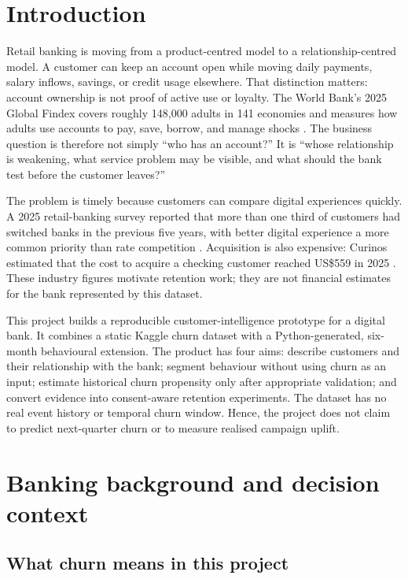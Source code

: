 \section{Introduction}

Retail banking is moving from a product-centred model to a relationship-centred model. A customer can keep an account open while moving daily payments, salary inflows, savings, or credit usage elsewhere. That distinction matters: account ownership is not proof of active use or loyalty. The World Bank's 2025 Global Findex covers roughly 148,000 adults in 141 economies and measures how adults use accounts to pay, save, borrow, and manage shocks \citep{worldbank2025findex}. The business question is therefore not simply ``who has an account?'' It is ``whose relationship is weakening, what service problem may be visible, and what should the bank test before the customer leaves?''

The problem is timely because customers can compare digital experiences quickly. A 2025 retail-banking survey reported that more than one third of customers had switched banks in the previous five years, with better digital experience a more common priority than rate competition \citep{baringa2025}. Acquisition is also expensive: Curinos estimated that the cost to acquire a checking customer reached US\$559 in 2025 \citep{curinos2025}. These industry figures motivate retention work; they are not financial estimates for the bank represented by this dataset.

This project builds a reproducible customer-intelligence prototype for a digital bank. It combines a static Kaggle churn dataset with a Python-generated, six-month behavioural extension. The product has four aims: describe customers and their relationship with the bank; segment behaviour without using churn as an input; estimate historical churn propensity only after appropriate validation; and convert evidence into consent-aware retention experiments. The dataset has no real event history or temporal churn window. Hence, the project does not claim to predict next-quarter churn or to measure realised campaign uplift.

\section{Banking background and decision context}

\subsection{What churn means in this project}


